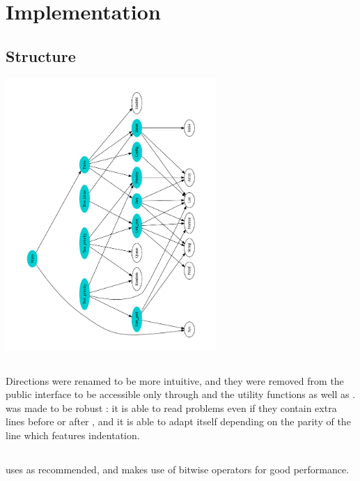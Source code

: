 \section{Implementation}


\subsection{Structure}
\begin{center}
\includegraphics[width=8cm]{deps.pdf}
\end{center}


\subsection{}

Directions were renamed to be more intuitive, and they were removed
from the public interface to be accessible only through 
and the utility functions  as well as .\\

 was made to be robust : it is able to read problems even
if they contain extra lines before  or after ,
and it is able to adapt itself depending on the parity of the line which
features indentation.


\subsection{}

 uses  as recommended, and makes use of
bitwise operators for good performance.\\

